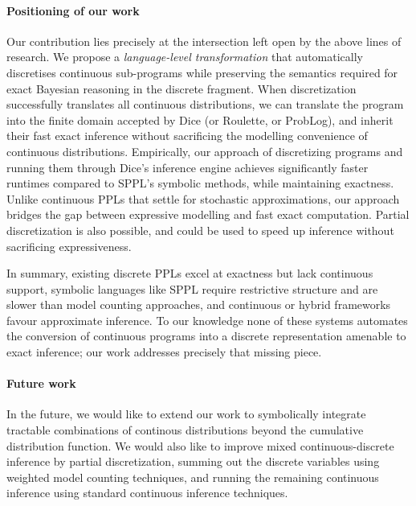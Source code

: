 \paragraph{Positioning of our work}  
Our contribution lies precisely at the intersection left open by the above lines of research. We propose a \emph{language-level transformation} that automatically discretises continuous sub-programs while preserving the semantics required for exact Bayesian reasoning in the discrete fragment. When discretization successfully translates all continuous distributions, we can translate the program into the finite domain accepted by Dice (or Roulette, or ProbLog), and inherit their fast exact inference without sacrificing the modelling convenience of continuous distributions. 
Empirically, our approach of discretizing programs and running them through Dice's inference engine achieves significantly faster runtimes compared to SPPL's symbolic methods, while maintaining exactness. Unlike continuous PPLs that settle for stochastic approximations, our approach bridges the gap between expressive modelling and fast exact computation. Partial discretization is also possible, and could be used to speed up inference without sacrificing expressiveness.

\medskip  
In summary, existing discrete PPLs excel at exactness but lack continuous support, symbolic languages like SPPL require restrictive structure and are slower than model counting approaches, and continuous or hybrid frameworks favour approximate inference. To our knowledge none of these systems automates the conversion of continuous programs into a discrete representation amenable to exact inference; our work addresses precisely that missing piece.

\paragraph{Future work}
In the future, we would like to extend our work to symbolically integrate tractable combinations of continous distributions beyond the cumulative distribution function.
We would also like to improve mixed continuous-discrete inference by partial discretization, summing out the discrete variables using weighted model counting techniques, and running the remaining continuous inference using standard continuous inference techniques.